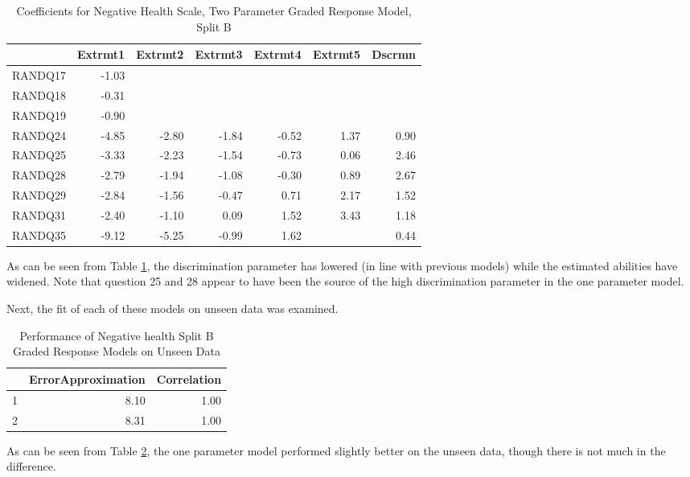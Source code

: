\documentclass{article}
\begin{document}
\begin{table}[ht]
\centering
\begin{tabular}{rrrrrrr}
  \hline
 & Extrmt1 & Extrmt2 & Extrmt3 & Extrmt4 & Extrmt5 & Dscrmn \\ 
  \hline
RANDQ17 & -1.03 &  &  &  &  &  \\ 
  RANDQ18 & -0.31 &  &  &  &  &  \\ 
  RANDQ19 & -0.90 &  &  &  &  &  \\ 
  RANDQ24 & -4.85 & -2.80 & -1.84 & -0.52 & 1.37 & 0.90 \\ 
  RANDQ25 & -3.33 & -2.23 & -1.54 & -0.73 & 0.06 & 2.46 \\ 
  RANDQ28 & -2.79 & -1.94 & -1.08 & -0.30 & 0.89 & 2.67 \\ 
  RANDQ29 & -2.84 & -1.56 & -0.47 & 0.71 & 2.17 & 1.52 \\ 
  RANDQ31 & -2.40 & -1.10 & 0.09 & 1.52 & 3.43 & 1.18 \\ 
  RANDQ35 & -9.12 & -5.25 & -0.99 & 1.62 &  & 0.44 \\ 
   \hline
\end{tabular}
\caption{Coefficients for Negative Health Scale, Two Parameter Graded Response Model, Split B} 
\label{tab:neghealth2bgrm2pl}
\end{table}

As can be seen from Table \ref{tab:neghealth2bgrm2pl}, the discrimination parameter has lowered (in line with previous models) while the estimated abilities have widened. Note that question 25 and 28 appear to have been the source of the high discrimination parameter in the one parameter model. 

Next, the fit of each of these models on unseen data was examined. 

\begin{table}[ht]
\centering
\begin{tabular}{rrr}
  \hline
 & ErrorApproximation & Correlation \\ 
  \hline
1 & 8.10 & 1.00 \\ 
  2 & 8.31 & 1.00 \\ 
   \hline
\end{tabular}
\caption{Performance of Negative health Split B Graded Response Models on Unseen Data} 
\label{tab:neghealth2bgrmtest}
\end{table}
As can be seen from Table \ref{tab:neghealth2bgrmtest}, the one parameter model performed slightly better on the unseen data, though there is not much in the difference. 
\end{document}
